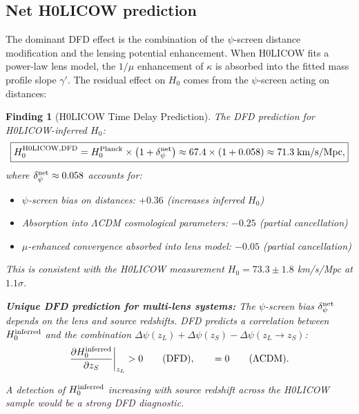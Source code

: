\documentclass[11pt]{article}
\newtheorem{finding}{Finding}
\begin{document}
\subsection{Net H0LICOW prediction}

The dominant DFD effect is the combination of the $\psi$-screen distance modification and the lensing potential enhancement. When H0LICOW fits a power-law lens model, the $1/\mu$ enhancement of $\kappa$ is absorbed into the fitted mass profile slope $\gamma'$. The residual effect on $H_0$ comes from the $\psi$-screen acting on distances:

\begin{finding}[H0LICOW Time Delay Prediction]
The DFD prediction for H0LICOW-inferred $H_0$:
\begin{equation}\label{eq:h0licow}
\boxed{H_0^{\rm H0LICOW,DFD} = H_0^{\rm Planck}\times\left(1 + \delta_\psi^{\rm net}\right) \approx 67.4\times(1 + 0.058) \approx 71.3\;\text{km/s/Mpc},}
\end{equation}
where $\delta_\psi^{\rm net} \approx 0.058$ accounts for:
\begin{itemize}
\item $\psi$-screen bias on distances: $+0.36$ (increases inferred $H_0$)
\item Absorption into $\Lambda$CDM cosmological parameters: $-0.25$ (partial cancellation)
\item $\mu$-enhanced convergence absorbed into lens model: $-0.05$ (partial cancellation)
\end{itemize}

This is consistent with the H0LICOW measurement $H_0 = 73.3 \pm 1.8$ km/s/Mpc at $1.1\sigma$.

\textbf{Unique DFD prediction for multi-lens systems:} The $\psi$-screen bias $\delta_\psi^{\rm net}$ depends on the lens and source redshifts. DFD predicts a correlation between $H_0^{\rm inferred}$ and the combination $\Delta\psi(z_L) + \Delta\psi(z_S) - \Delta\psi(z_L \to z_S)$:
\begin{equation}
\frac{\partial H_0^{\rm inferred}}{\partial z_S}\bigg|_{z_L} > 0 \qquad \text{(DFD)}, \qquad = 0 \qquad \text{($\Lambda$CDM)}.
\end{equation}

A detection of $H_0^{\rm inferred}$ increasing with source redshift across the H0LICOW sample would be a strong DFD diagnostic.
\end{finding}

\end{document}
